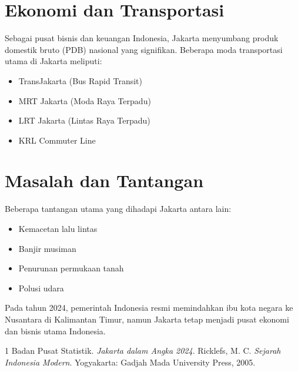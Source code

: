 \documentclass[a4paper,12pt]{article}
\begin{document}
\section{Ekonomi dan Transportasi}

Sebagai pusat bisnis dan keuangan Indonesia, Jakarta menyumbang produk domestik bruto (PDB) nasional yang signifikan. Beberapa moda transportasi utama di Jakarta meliputi:

\begin{itemize}
    \item TransJakarta (Bus Rapid Transit)
    \item MRT Jakarta (Moda Raya Terpadu)
    \item LRT Jakarta (Lintas Raya Terpadu)
    \item KRL Commuter Line
\end{itemize}

\section{Masalah dan Tantangan}

Beberapa tantangan utama yang dihadapi Jakarta antara lain:
\begin{itemize}
    \item Kemacetan lalu lintas
    \item Banjir musiman
    \item Penurunan permukaan tanah
    \item Polusi udara
\end{itemize}

Pada tahun 2024, pemerintah Indonesia resmi memindahkan ibu kota negara ke Nusantara di Kalimantan Timur, namun Jakarta tetap menjadi pusat ekonomi dan bisnis utama Indonesia.

\begin{thebibliography}{1}
     Badan Pusat Statistik. \textit{Jakarta dalam Angka 2024}.
     Ricklefs, M. C. \textit{Sejarah Indonesia Modern}. Yogyakarta: Gadjah Mada University Press, 2005.
\end{thebibliography}
\end{document}
